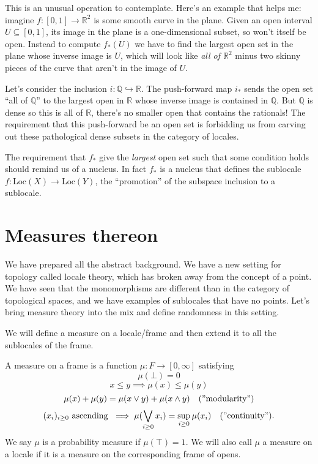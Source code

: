\documentclass[12pt]{extarticle}
\begin{document}
This is an unusual operation to contemplate. Here's an example that helps me: imagine $f:[0,1]\to\mathbb{R}^2$ is some smooth curve in the plane. Given an open interval $U\subseteq[0,1]$, its image in the plane is a one-dimensional subset, so won't itself be open. Instead to compute $f_*(U)$ we have to find the largest open set in the plane whose inverse image is $U$, which will look like \emph{all of $\mathbb{R}^2$} minus two skinny pieces of the curve that aren't in the image of $U$.

Let's consider the inclusion $i:\mathbb{Q}\hookrightarrow\mathbb{R}$. The  push-forward map $i_*$ sends the open set ``all of $\mathbb{Q}$'' to the largest open in $\mathbb{R}$ whose inverse image is contained in $\mathbb{Q}$. But $\mathbb{Q}$ is dense so this is all of $\mathbb{R}$, there's no smaller open that contains the rationals! The requirement that this push-forward be an open set is forbidding us from carving out these pathological dense subsets in the category of locales.

The requirement that $f_*$ give the \emph{largest} open set such that some condition holds should remind us of a nucleus. In fact $f_*$ is a nucleus that defines the sublocale $f:\mathrm{Loc}(X)\to \mathrm{Loc}(Y)$, the ``promotion'' of the subspace inclusion to a sublocale.

\section{Measures thereon}
We have prepared all the abstract background. We have a new setting for topology called locale theory, which has broken away from the concept of a point. We have seen that the monomorphisms are different than in the category of topological spaces, and we have examples of sublocales that have no points. Let's bring measure theory into the mix and define randomness in this setting.

We will define a measure on a locale/frame and then extend it to all the sublocales of the frame.

A measure on a frame is a function $\mu:F\to [0,\infty]$ satisfying
$$\mu(\bot)=0$$
$$x\leq y\implies \mu(x)\leq\mu(y)$$
$$\mu(x)+\mu(y)=\mu(x\vee y)+\mu(x\wedge y)\quad\mathrm{("modularity")}$$
$$(x_i)_{i\geq 0}\mathrm{\ ascending\ }\implies \mu(\bigvee_{i\geq 0}x_i)=\sup_{i\geq 0}\mu(x_i)\quad\mathrm{("continuity")}.$$
We say $\mu$ is a probability measure if $\mu(\top)=1$. We will also call $\mu$ a measure on a locale if it is a measure on the corresponding frame of opens.
\end{document}
